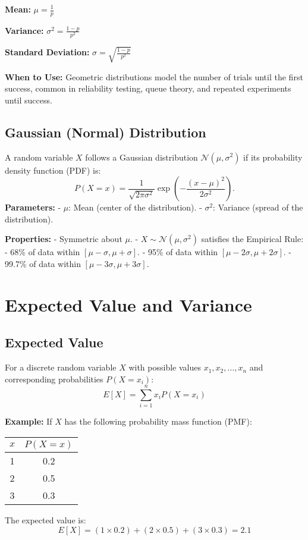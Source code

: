 \documentclass{article}
\begin{document}
\begin{multicols}{2}
\textbf{Mean:} \( \mu = \frac{1}{p} \)

\textbf{Variance:} \( \sigma^2 = \frac{1 - p}{p^2} \)

\textbf{Standard Deviation:} \( \sigma = \sqrt{\frac{1 - p}{p^2}} \)

\textbf{When to Use:}
Geometric distributions model the number of trials until the first success, common in reliability testing, queue theory, and repeated experiments until success.

\subsection*{Gaussian (Normal) Distribution}
A random variable \( X \) follows a Gaussian distribution \( \mathcal{N}(\mu, \sigma^2) \) if its probability density function (PDF) is:
\[
P(X = x) = \frac{1}{\sqrt{2\pi\sigma^2}} \exp\left(-\frac{(x-\mu)^2}{2\sigma^2}\right).
\]
\textbf{Parameters:}
- \( \mu \): Mean (center of the distribution).
- \( \sigma^2 \): Variance (spread of the distribution).

\textbf{Properties:}
- Symmetric about \( \mu \).
- \( X \sim \mathcal{N}(\mu, \sigma^2) \) satisfies the Empirical Rule:
  - 68\% of data within \( [\mu - \sigma, \mu + \sigma] \).
  - 95\% of data within \( [\mu - 2\sigma, \mu + 2\sigma] \).
  - 99.7\% of data within \( [\mu - 3\sigma, \mu + 3\sigma] \).

\section*{Expected Value and Variance}

\subsection*{Expected Value}
For a discrete random variable \( X \) with possible values \( x_1, x_2, \dots, x_n \) and corresponding probabilities \( P(X = x_i) \):
\[
E[X] = \sum_{i=1}^n x_i P(X = x_i)
\]

\textbf{Example:}
If \( X \) has the following probability mass function (PMF):
\begin{center}
\begin{tabular}{|c|c|}
\hline
\( x \) & \( P(X = x) \) \\
\hline
1 & 0.2 \\
2 & 0.5 \\
3 & 0.3 \\
\hline
\end{tabular}
\end{center}
The expected value is:
\[
E[X] = (1 \times 0.2) + (2 \times 0.5) + (3 \times 0.3) = 2.1
\]


\end{multicols}
\end{document}
